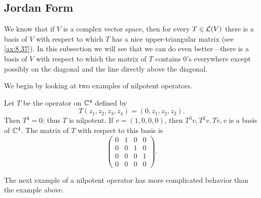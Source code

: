 \subsection{Jordan Form}

We know that if $V$ is a complex vector space, then for every $T\in\mathcal{L}(V)$
there is a basis of $V$ with respect to which $T$ has a nice upper-triangular
matrix (see \ref{ax:8.37}). In this subsection we will see that we can do even
better---there is a basis of $V$ with respect to which the matrix of $T$
contains $0$'s everywhere except possibly on the diagonal and the line directly
above the diagonal.

We begin by looking at two examples of nilpotent operators.

\begin{example}\label{ax:8.42}
Let $T$ be the operator on $\mathbb{C}^4$ defined by
\[ T(z_1,z_2,z_3,z_4) = (0,z_1,z_2,z_3). \]
Then $T^4=0$; thus $T$ is nilpotent. If $v=(1,0,0,0)$, then $T^3v,T^2v,Tv,v$ is
a basis of $\mathbb{C}^4$. The matrix of $T$ with respect to this basis is
\[ \begin{pmatrix}
0&1&0&0\\
0&0&1&0\\
0&0&0&1\\
0&0&0&0
\end{pmatrix}. \]
\end{example}

The next example of a nilpotent operator has more complicated behavior than the
example above.

